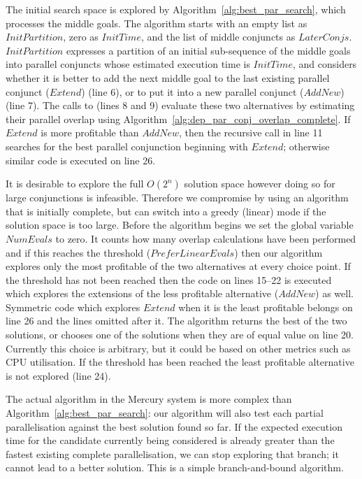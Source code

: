 The initial search space is explored by
Algorithm~\ref{alg:best_par_search}, which processes the middle goals.
The algorithm starts with an empty list as  $InitPartition$,
zero as $InitTime$, and the list of middle conjuncts as $LaterConjs$.
$InitPartition$ expresses a partition of an initial sub-sequence
of the middle goals into parallel conjuncts
whose estimated execution time is $InitTime$,
and considers whether it is better to add the next middle goal
to the last existing parallel conjunct ($Extend$) (line 6),
or to put it into a new parallel conjunct ($AddNew$) (line 7).
The calls to \findpartime (lines 8 and 9) evaluate these two alternatives by
estimating their parallel overlap using
Algorithm~\ref{alg:dep_par_conj_overlap_complete}.
If $Extend$ is more profitable than $AddNew$,
then the recursive call in line 11 searches for the best parallel
conjunction beginning with $Extend$;
otherwise similar code is executed on line 26.

It is desirable to explore the full $O(2^n)$ solution space however doing so
for large conjunctions is infeasible.
Therefore we compromise by using an algorithm that is
initially complete,
but can switch into a greedy (linear) mode if the solution space is too
large.
Before the algorithm begins we set the global variable $NumEvals$ to zero.
It counts how many overlap calculations have been performed
and if this reaches the threshold ($PreferLinearEvals$) then our algorithm
explores only the most profitable of the two alternatives at every choice
point.
If the threshold has not been reached then the code on lines 15--22 
is executed
which explores the extensions of the less profitable alternative ($AddNew$)
as well.
Symmetric code which explores $Extend$ when it is the least profitable
belongs on line 26 and the lines omitted after it.
The algorithm returns the best of the two solutions,
or chooses one of the solutions when they are of equal value on line 20.
Currently this choice is arbitrary,
but it could be based on other metrics such as CPU utilisation.
If the threshold has been reached the least profitable alternative is not
explored (line 24).

The actual algorithm in the Mercury system is more complex than
Algorithm~\ref{alg:best_par_search}:
our algorithm will also test each partial parallelisation against the best
solution found so far.
If the expected execution time for the candidate currently being considered
is already greater than the fastest existing complete parallelisation,
we can stop exploring that branch;
it cannot lead to a better solution.
This is a simple branch-and-bound algorithm.

